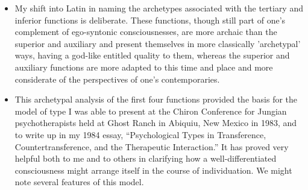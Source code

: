 \begin{itemize}
\item My shift into Latin in naming the archetypes associated with the tertiary
and inferior functions is deliberate. These functions, though still part of
one's complement of ego-syntonic consciousnesses, are more archaic than the
superior and auxiliary and present themselves in more classically 'archetypal'
ways, having a god-like entitled quality to them, whereas the superior and
auxiliary functions are more adapted to this time and place and more
considerate of the perspectives of one's contemporaries.

\item {} This archetypal analysis of the first
four functions provided the basis for the model of type I was able to present
at the Chiron Conference for Jungian psychotherapists held at Ghost Ranch in
Abiquiu, New Mexico in 1983, and to write up in my 1984 essay, ``Psychological
Types in Transference, Countertransference, and the Therapeutic Interaction.''
It has proved very helpful both to me and to others in clarifying how a
well-differentiated consciousness might arrange itself in the course of
individuation. We might note several features of this model.

\begin{figure}[h]
  \centering
\end{figure}
\end{itemize}
